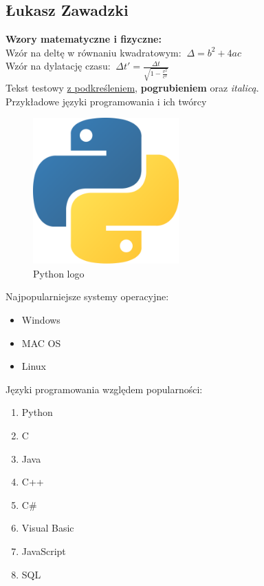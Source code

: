 \begin{flushleft}
\section{Łukasz Zawadzki}
\label{sec:lzawadzki}

\vspace{0.5cm}

\textbf{Wzory matematyczne i fizyczne:}\\
Wzór na deltę w równaniu kwadratowym:
$ \ \Delta=b^2+4ac \ $\\
Wzór na dylatację czasu:
$ \ \Delta t'= \frac{\Delta t}{\sqrt{1-\frac{v^2}{c^2}}} \ $
\vspace{0.5cm}\\
Tekst testowy \underline{z podkreśleniem}, \textbf{pogrubieniem} oraz \textit{italicą}.\\
\vspace{0.5cm}
Przykładowe języki programowania i ich twórcy


\label{tab:Języki}
\vspace{1.0cm}

\begin{figure}[htbp]
    \centering
    \includegraphics[width=0.5\textwidth]{Pictures/6_LZawadzki.png}
    \caption{Python logo}
    \label{fig:Python_logo}
\end{figure}
\vspace{0.5cm}


Najpopularniejsze systemy operacyjne:
\begin{itemize}
\renewcommand{\labelitemi}{$>$}
    \item Windows
    \item MAC OS
    \item Linux
\end{itemize}
\vspace{0.5cm}
Języki programowania względem popularności:
\begin{enumerate}
    \item Python
    \item C
    \item Java
    \item C++
    \item C\#
    \item Visual Basic
    \item JavaScript
    \item SQL
\end{enumerate}



\end{flushleft}
